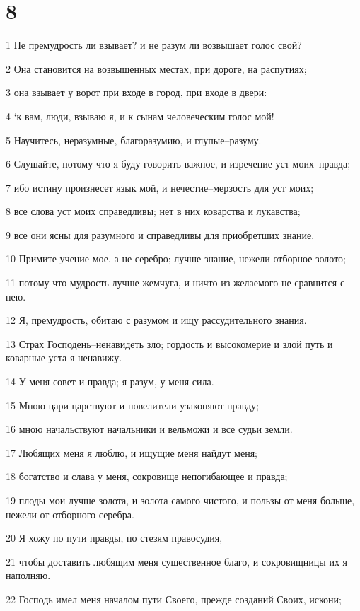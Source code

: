 \chapter{8}

\par 1 Не премудрость ли взывает? и не разум ли возвышает голос свой?
\par 2 Она становится на возвышенных местах, при дороге, на распутиях;
\par 3 она взывает у ворот при входе в город, при входе в двери:
\par 4 `к вам, люди, взываю я, и к сынам человеческим голос мой!
\par 5 Научитесь, неразумные, благоразумию, и глупые--разуму.
\par 6 Слушайте, потому что я буду говорить важное, и изречение уст моих--правда;
\par 7 ибо истину произнесет язык мой, и нечестие--мерзость для уст моих;
\par 8 все слова уст моих справедливы; нет в них коварства и лукавства;
\par 9 все они ясны для разумного и справедливы для приобретших знание.
\par 10 Примите учение мое, а не серебро; лучше знание, нежели отборное золото;
\par 11 потому что мудрость лучше жемчуга, и ничто из желаемого не сравнится с нею.
\par 12 Я, премудрость, обитаю с разумом и ищу рассудительного знания.
\par 13 Страх Господень--ненавидеть зло; гордость и высокомерие и злой путь и коварные уста я ненавижу.
\par 14 У меня совет и правда; я разум, у меня сила.
\par 15 Мною цари царствуют и повелители узаконяют правду;
\par 16 мною начальствуют начальники и вельможи и все судьи земли.
\par 17 Любящих меня я люблю, и ищущие меня найдут меня;
\par 18 богатство и слава у меня, сокровище непогибающее и правда;
\par 19 плоды мои лучше золота, и золота самого чистого, и пользы от меня больше, нежели от отборного серебра.
\par 20 Я хожу по пути правды, по стезям правосудия,
\par 21 чтобы доставить любящим меня существенное благо, и сокровищницы их я наполняю.
\par 22 Господь имел меня началом пути Своего, прежде созданий Своих, искони;
